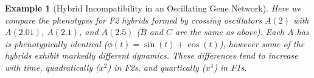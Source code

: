 \documentclass{article}
\newcommand{\1}{\mathbbm{1}}
\newtheorem{example}{Example}
\begin{document}
      \begin{example}[Hybrid Incompatibility in an Oscillating Gene Network]

        Here we compare the phenotypes for F2 hybrids formed by crossing oscillators $A(2)$ with $A(2.01)$, $A(2.1)$, and $A(2.5)$ ($B$ and $C$ are the same as above). Each $A$ has is phenotypically identical ($\phi(t) = \sin(t) + \cos(t)$), however some of the hybrids exhibit markedly different dynamics. These differences tend to increase with time, quadratically ($x^{2}$) in F2s, and quartically ($x^{4}$) in F1s. 



\end{example}
\end{document}
